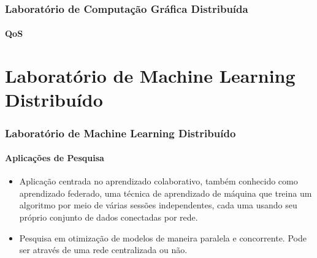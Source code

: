 \documentclass{beamer}
\begin{document}
\begin{frame}
\frametitle{Laboratório de Computação Gráfica Distribuída}
\framesubtitle{QoS}
\begin{table}
  \centering
    \caption{Análise quantitativa de QoS para o Laboratório de Computação Gráfica Distribuída}
\end{table}
\end{frame}

\section[]{Laboratório de Machine Learning Distribuído}
\begin{frame}
\frametitle{Laboratório de Machine Learning Distribuído}
\framesubtitle{Aplicações de Pesquisa}
\begin{itemize}
\item{Aplicação centrada no aprendizado colaborativo, também conhecido como aprendizado federado, uma técnica de aprendizado de máquina que treina um algoritmo por meio de várias sessões independentes, cada uma usando seu próprio conjunto de dados conectadas por rede.}
\item{Pesquisa em otimização de modelos de maneira paralela e concorrente. Pode ser através de uma rede centralizada ou não.}
\end{itemize}
\end{frame}
\end{document}
